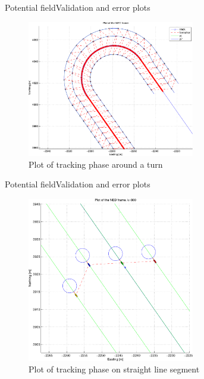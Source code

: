 \documentclass[10pt,handout]{beamer}
\begin{document}
\begin{frame}{Potential field}{Validation and error plots}
  \begin{figure}
    \includegraphics[width=0.65\textwidth]{img/pdftotalligeplussving}
    \caption{Plot of tracking phase around a turn}
  \end{figure}
\end{frame}

\begin{frame}{Potential field}{Validation and error plots}
  \begin{figure}
    \includegraphics[width=0.65\textwidth]{img/pdfligestykke}
    \caption{Plot of tracking phase on straight line segment}
  \end{figure}
\end{frame}
\end{document}
